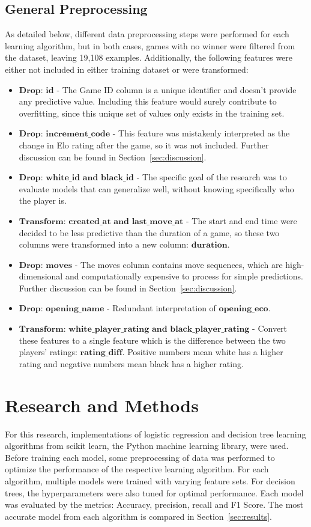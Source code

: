 \documentclass[12pt]{article}
\begin{document}
\subsection{General Preprocessing}
As detailed below, different data preprocessing steps were performed for each learning algorithm, but in both cases, games with no winner were filtered from the dataset, leaving 19,108 examples. Additionally, the following features were either not included in either training dataset or were transformed:

\begin{itemize}[label={}, leftmargin=0pt]
  \item $\textbf{Drop: id}$ - The Game ID column is a unique identifier and doesn’t provide any predictive value. Including this feature would surely contribute to overfitting, since this unique set of values only exists in the training set.
  \item $\textbf{Drop: increment\_code}$ - This feature was mistakenly interpreted as the change in Elo rating after the game, so it was not included. Further discussion can be found in Section~\ref{sec:discussion}.
  \item $\textbf{Drop: white\_id and black\_id}$ - The specific goal of the research was to evaluate models that can generalize well, without knowing specifically who the player is.
  \item $\textbf{Transform: created\_at and last\_move\_at}$ - The start and end time were decided to be less predictive than the duration of a game, so these two columns were transformed into a new column: $\textbf{duration}$.
  \item $\textbf{Drop: moves}$ - The moves column contains move sequences, which are high-dimensional and computationally expensive to process for simple predictions. Further discussion can be found in Section~\ref{sec:discussion}.
  \item $\textbf{Drop: opening\_name}$ - Redundant interpretation of $\textbf{opening\_eco}$.
  \item $\textbf{Transform: white\_player\_rating and black\_player\_rating}$ - Convert these features to a single feature which is the difference between the two players' ratings: $\textbf{rating\_diff}$. Positive numbers mean white has a higher rating and negative numbers mean black has a higher rating.
\end{itemize}

\section{Research and Methods}
\label{sec:methods}
For this research, implementations of logistic regression and decision tree learning algorithms from scikit learn, the Python machine learning library, were used. Before training each model, some preprocessing of data was performed to optimize the performance of the respective learning algorithm. For each algorithm, multiple models were trained with varying feature sets. For decision trees, the hyperparameters were also tuned for optimal performance. Each model was evaluated by the metrics: Accuracy, precision, recall and F1 Score. The most accurate model from each algorithm is compared in Section~\ref{sec:results}.
\end{document}
